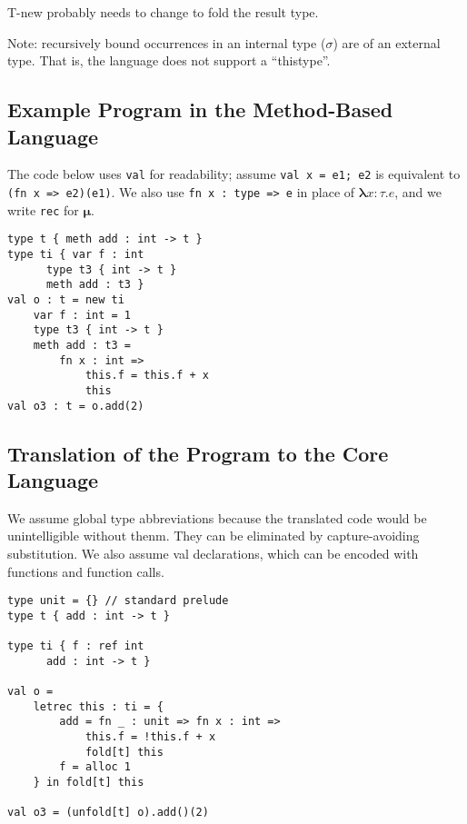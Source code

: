 


T-new probably needs to change to fold the result type.


Note: recursively bound occurrences in an internal type ($\sigma$) are of an external type.  That is, the language does not support a ``thistype''.


\newpage 

\subsection{Example Program in the Method-Based Language}

The code below uses \lstinline!val! for readability; assume \lstinline!val x = e1; e2! is equivalent to \lstinline!(fn x => e2)(e1)!.  We also use \lstinline!fn x : type => e! in place of $\boldsymbol\lambda x{:}\tau . e$, and we write \lstinline!rec! for $\boldsymbol\mu$.

\begin{lstlisting}
type t { meth add : int -> t }
type ti { var f : int
	  type t3 { int -> t }
	  meth add : t3 }
val o : t = new ti
	var f : int = 1
	type t3 { int -> t }
	meth add : t3 =
		fn x : int =>
			this.f = this.f + x
			this
val o3 : t = o.add(2)
\end{lstlisting}


\subsection{Translation of the Program to the Core Language}

We assume global type abbreviations because the translated code would be unintelligible without thenm.  They can be eliminated by capture-avoiding substitution.  We also assume val declarations, which can be encoded with functions and function calls.

\begin{lstlisting}
type unit = {} // standard prelude
type t { add : int -> t }
	
type ti { f : ref int
	  add : int -> t }
	
val o =
	letrec this : ti = {
		add = fn _ : unit => fn x : int =>
			this.f = !this.f + x
			fold[t] this
		f = alloc 1
	} in fold[t] this

val o3 = (unfold[t] o).add()(2)
\end{lstlisting}

